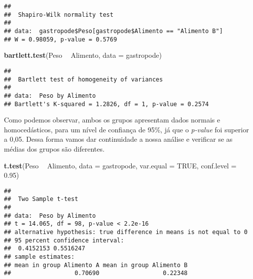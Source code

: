 \documentclass[titlepage, oneside, openany, a4paper]{book}
\newenvironment{Shaded}{\begin{snugshade}}{\end{snugshade}}
\newcommand{\DataTypeTok}[1]{\textcolor[rgb]{0.13,0.29,0.53}{#1}}
\newcommand{\FloatTok}[1]{\textcolor[rgb]{0.00,0.00,0.81}{#1}}
\newcommand{\KeywordTok}[1]{\textcolor[rgb]{0.13,0.29,0.53}{\textbf{#1}}}
\newcommand{\NormalTok}[1]{#1}
\newcommand{\OperatorTok}[1]{\textcolor[rgb]{0.81,0.36,0.00}{\textbf{#1}}}
\newcommand{\OtherTok}[1]{\textcolor[rgb]{0.56,0.35,0.01}{#1}}
\newcommand{\StringTok}[1]{\textcolor[rgb]{0.31,0.60,0.02}{#1}}
\begin{document}
\begin{Shaded}
\end{Shaded}

\begin{verbatim}
## 
##  Shapiro-Wilk normality test
## 
## data:  gastropode$Peso[gastropode$Alimento == "Alimento B"]
## W = 0.98059, p-value = 0.5769
\end{verbatim}

\begin{Shaded}
\begin{Highlighting}[]
\KeywordTok{bartlett.test}\NormalTok{(Peso }\OperatorTok{~}\StringTok{ }\NormalTok{Alimento, }\DataTypeTok{data =}\NormalTok{ gastropode)}
\end{Highlighting}
\end{Shaded}

\begin{verbatim}
## 
##  Bartlett test of homogeneity of variances
## 
## data:  Peso by Alimento
## Bartlett's K-squared = 1.2826, df = 1, p-value = 0.2574
\end{verbatim}

Como podemos observar, ambos os grupos apresentam dados normais e homocedásticos, para um nível de confiança de 95\%, já que o \emph{p-value} foi superior a 0,05. Dessa forma vamos dar continuidade a nossa análise e verificar se as médias dos grupos são diferentes.

\begin{Shaded}
\begin{Highlighting}[]
\KeywordTok{t.test}\NormalTok{(Peso }\OperatorTok{~}\StringTok{ }\NormalTok{Alimento, }
       \DataTypeTok{data =}\NormalTok{ gastropode,}
       \DataTypeTok{var.equal =} \OtherTok{TRUE}\NormalTok{,}
       \DataTypeTok{conf.level =} \FloatTok{0.95}\NormalTok{)}
\end{Highlighting}
\end{Shaded}

\begin{verbatim}
## 
##  Two Sample t-test
## 
## data:  Peso by Alimento
## t = 14.065, df = 98, p-value < 2.2e-16
## alternative hypothesis: true difference in means is not equal to 0
## 95 percent confidence interval:
##  0.4152153 0.5516247
## sample estimates:
## mean in group Alimento A mean in group Alimento B 
##                  0.70690                  0.22348
\end{verbatim}
\end{document}
